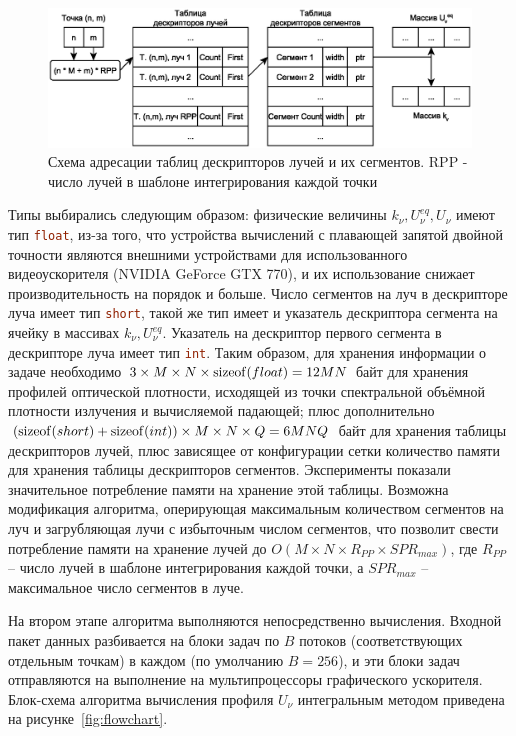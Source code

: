 \begin{figure}
    \centering
    \includegraphics[width=\linewidth]{img/luminInt/address}
    \caption{Схема адресации таблиц дескрипторов лучей и их сегментов. RPP - 
    число лучей в шаблоне интегрирования каждой точки}
    \label{fig:address}
\end{figure}

Типы выбирались следующим образом: физические величины $k_\nu, U_\nu^{eq}, 
U_\nu$ имеют тип \lstinline[language=c]|float|, из-за того, что устройства 
вычислений с плавающей запятой двойной точности являются внешними устройствами 
для использованного видеоускорителя (NVIDIA GeForce GTX 770), и их 
использование снижает производительность на порядок и больше. Число сегментов 
на луч в дескрипторе луча имеет тип \lstinline[language=c]|short|, такой же тип 
имеет и указатель дескриптора сегмента на ячейку в массивах $k_\nu, 
U_\nu^{eq}$. Указатель на дескриптор первого сегмента в дескрипторе луча имеет 
тип \lstinline[language=c]|int|. Таким образом, для хранения информации о 
задаче необходимо $3 \times M \times N \times \operatorname{sizeof}(float) = 12MN$ байт для 
хранения профилей оптической плотности, исходящей из точки спектральной 
объёмной плотности излучения и вычисляемой падающей; плюс дополнительно 
$(\operatorname{sizeof}(short)+\operatorname{sizeof}(int))\times M \times N \times Q = 6MNQ$ байт для 
хранения таблицы дескрипторов лучей, плюс зависящее от конфигурации сетки 
количество памяти для хранения таблицы дескрипторов сегментов. Эксперименты 
показали значительное потребление памяти на хранение этой таблицы. Возможна 
модификация алгоритма, оперирующая максимальным количеством сегментов на луч и 
загрубляющая лучи с избыточным числом сегментов, что позволит свести 
потребление памяти на хранение лучей до $O(M\times N \times R_{PP} \times 
SPR_{max})$, где $R_{PP}$ -- число лучей в шаблоне интегрирования каждой точки, 
а $SPR_{max}$ -- максимальное число сегментов в луче.

На втором этапе алгоритма выполняются непосредственно вычисления. Входной пакет 
данных разбивается на блоки задач по $B$ потоков (соответствующих отдельным 
точкам) в каждом (по умолчанию $B=256$), и эти блоки задач отправляются на 
выполнение на мультипроцессоры графического ускорителя. Блок-схема алгоритма 
вычисления профиля $U_\nu$ интегральным методом приведена на 
рисунке~\ref{fig:flowchart}.

